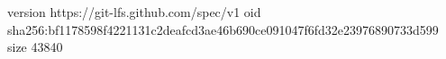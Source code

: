 version https://git-lfs.github.com/spec/v1
oid sha256:bf1178598f4221131c2deafcd3ae46b690ce091047f6fd32e23976890733d599
size 43840
